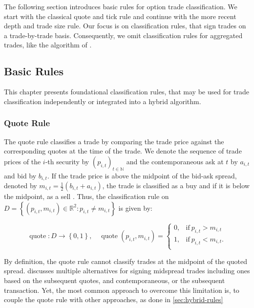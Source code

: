 The following section introduces basic rules for option trade classification. We start with the classical quote and tick rule and continue with the more recent depth and trade size rule. Our focus is on classification rules, that sign trades on a trade-by-trade basis. Consequently, we omit classification rules for aggregated trades, like the  algorithm of \textcite[][1466--1468]{easleyFlowToxicityLiquidity2012}.

\subsection{Basic Rules}\label{sec:basic-rules}

This chapter presents foundational classification rules, that may be used for trade classification independently or integrated into a hybrid algorithm.

\subsubsection{Quote Rule}\label{sec:quote-rule}

The quote rule classifies a trade by comparing the trade price against the corresponding quotes at the time of the trade. We denote the sequence of trade prices of the $i$-th security by $(p_{i,t})_{t\in\mathbb{N}}$ and the contemporaneous ask at $t$ by $a_{i,t}$ and bid by $b_{i,t}$. If the trade price is above the midpoint of the bid-ask spread, denoted by $m_{i,t} = \tfrac{1}{2}(b_{i,t} + a_{i,t})$, the trade is classified as a buy and if it is below the midpoint, as a sell \autocite[][41]{harrisDayEndTransactionPrice1989}. Thus, the classification rule on $D = \left\{(p_{i,t}, m_{i,t}) \in \mathbb{R}^2: p_{i,t} \neq m_{i,t}\right\}$ is given by:

\begin{equation}
  \operatorname{quote}\colon D \to \left\{0, 1\right\},\quad
  \operatorname{quote}(p_{i,t}, m_{i,t})=
  \begin{cases}
    0, & \text{if}\ p_{i, t}>m_{i, t}  \\
    1, & \text{if}\ p_{i, t}<m_{i, t}. \\
  \end{cases}
\end{equation}

By definition, the quote rule cannot classify trades at the midpoint of the quoted spread. \textcite[][241]{hasbrouckTradesQuotesInventories1988} discusses multiple alternatives for signing midspread trades including ones based on the subsequent quotes, and contemporaneous, or the subsequent transaction. Yet, the most common approach to overcome this limitation is, to couple the quote rule with other approaches, as done in \cref{sec:hybrid-rules}

